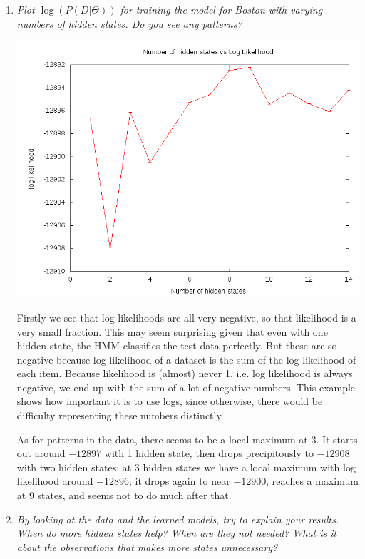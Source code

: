 \documentclass{article}
\begin{document}
\begin{enumerate}[(a)]
\begin{enumerate}
\begin{itemize}
    \end{itemize}

  \item \emph{Plot $\log(P(D|\Theta))$ for training the model for Boston with
    varying numbers of hidden states. Do you see any patterns?}

    \begin{center}
      \includegraphics[scale=0.5]{4civ_plot.png}
    \end{center}

    Firstly we see that log likelihoods are all very negative, so that
    likelihood is a very small fraction. This may seem surprising
    given that even with one hidden state, the HMM classifies the test
    data perfectly. But these are so negative because log likelihood
    of a dataset is the sum of the log likelihood of each
    item. Because likelihood is (almost) never 1, i.e. log likelihood
    is always negative, we end up with the sum of a lot of negative
    numbers.  This example shows how important it is to use logs,
    since otherwise, there would be difficulty representing these
    numbers distinctly.

    As for patterns in the data, there seems to be a local maximum at
    3. It starts out around $-12897$ with 1 hidden state, then drops
    precipitously to $-12908$ with two hidden states; at 3 hidden
    states we have a local maximum with log likelihood around
    $-12896$; it drops again to near $-12900$, reaches a maximum at 9
    states, and seems not to do much after that.

  \item \emph{By looking at the data and the learned models, try to explain your
    results. When do more hidden states help? When are they not needed? What is
    it about the observations that makes more states unnecessary?}


\end{enumerate}
\end{enumerate}
\end{document}
